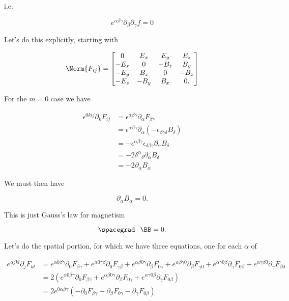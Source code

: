 i.e.

\begin{equation}\label{eqn:relativisticElectrodynamicsL11:810}
e^{\alpha\beta\gamma} \partial_\beta \partial_\gamma f = 0
\end{equation}

Let's do this explicitly, starting with

\begin{equation}\label{eqn:relativisticElectrodynamicsL10:370}
\Norm{ F_{i j} } = 
\begin{bmatrix}
0 & E_x & E_y & E_z \\
-E_x & 0 & -B_z & B_y \\
-E_y & B_z & 0 & -B_x \\
-E_z & -B_y & B_x & 0.
\end{bmatrix}
\end{equation}

For the $m= 0$ case we have

\begin{align*}
\epsilon^{0 k i j} \partial_k F_{i j}
&=
\epsilon^{\alpha \beta \gamma} \partial_\alpha F_{\beta \gamma} \\
&= 
\epsilon^{\alpha \beta \gamma} \partial_\alpha (-\epsilon_{\beta \gamma \delta} B_\delta) \\
&= 
-\epsilon^{\alpha \beta \gamma} \epsilon_{\delta \beta \gamma }
\partial_\alpha B_\delta \\
&= 
- 2 {\delta^\alpha}_\delta \partial_\alpha B_\delta \\
&= 
- 2 \partial_\alpha B_\alpha 
\end{align*}

We must then have

\begin{equation}\label{eqn:relativisticElectrodynamicsL11:830}
\partial_\alpha B_\alpha = 0.
\end{equation}

This is just Gauss's law for magnetism

\begin{equation}\label{eqn:relativisticElectrodynamicsL11:850}
\spacegrad \cdot \BB = 0.
\end{equation}

Let's do the spatial portion, for which we have three equations, one for each $\alpha$ of

\begin{align*}
e^{\alpha j k l} \partial_j F_{k l}
&=
e^{\alpha 0 \beta \gamma} \partial_0 F_{\beta \gamma}
+e^{\alpha 0 \gamma \beta} \partial_0 F_{\gamma \beta}
+e^{\alpha \beta 0 \gamma} \partial_\beta F_{0 \gamma}
+e^{\alpha \beta \gamma 0} \partial_\beta F_{\gamma 0}
+e^{\alpha \gamma 0 \beta} \partial_\gamma F_{0 \beta}
+e^{\alpha \gamma \beta 0} \partial_\gamma F_{\beta 0} \\
&=
2 \left( 
e^{\alpha 0 \beta \gamma} \partial_0 F_{\beta \gamma}
+e^{\alpha \beta 0 \gamma} \partial_\beta F_{0 \gamma}
+e^{\alpha \gamma 0 \beta} \partial_\gamma F_{0 \beta}
\right) \\
&=
2 e^{0 \alpha \beta \gamma} \left(
-\partial_0 F_{\beta \gamma}
+\partial_\beta F_{0 \gamma}
- \partial_\gamma F_{0 \beta}
\right)
\end{align*}


